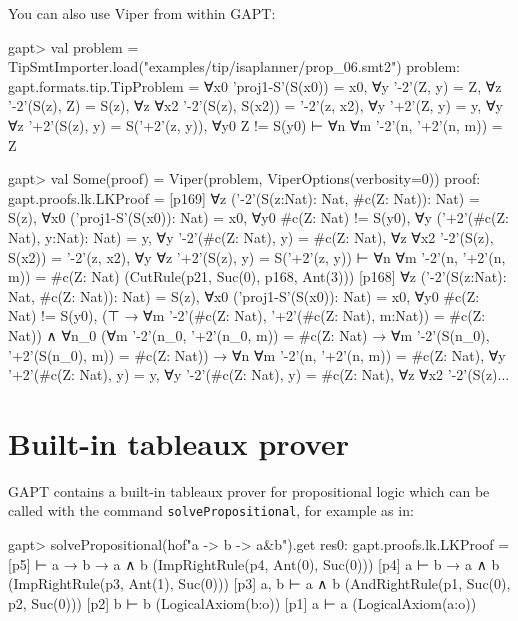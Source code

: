 \documentclass[a4paper,11pt]{book}
\begin{document}
You can also use Viper from within GAPT:
\begin{clilisting}
gapt> val problem = TipSmtImporter.load("examples/tip/isaplanner/prop_06.smt2")
problem: gapt.formats.tip.TipProblem =
∀x0 'proj1-S'(S(x0)) = x0,
∀y '-2'(Z, y) = Z,
∀z '-2'(S(z), Z) = S(z),
∀z ∀x2 '-2'(S(z), S(x2)) = '-2'(z, x2),
∀y '+2'(Z, y) = y,
∀y ∀z '+2'(S(z), y) = S('+2'(z, y)),
∀y0 Z != S(y0)
⊢
∀n ∀m '-2'(n, '+2'(n, m)) = Z

gapt> val Some(proof) = Viper(problem, ViperOptions(verbosity=0))
proof: gapt.proofs.lk.LKProof =
[p169] ∀z ('-2'(S(z:Nat): Nat, #c(Z: Nat)): Nat) = S(z),
∀x0 ('proj1-S'(S(x0)): Nat) = x0,
∀y0 #c(Z: Nat) != S(y0),
∀y ('+2'(#c(Z: Nat), y:Nat): Nat) = y,
∀y '-2'(#c(Z: Nat), y) = #c(Z: Nat),
∀z ∀x2 '-2'(S(z), S(x2)) = '-2'(z, x2),
∀y ∀z '+2'(S(z), y) = S('+2'(z, y))
⊢
∀n ∀m '-2'(n, '+2'(n, m)) = #c(Z: Nat)    (CutRule(p21, Suc(0), p168, Ant(3)))
[p168] ∀z ('-2'(S(z:Nat): Nat, #c(Z: Nat)): Nat) = S(z),
∀x0 ('proj1-S'(S(x0)): Nat) = x0,
∀y0 #c(Z: Nat) != S(y0),
(⊤ → ∀m '-2'(#c(Z: Nat), '+2'(#c(Z: Nat), m:Nat)) = #c(Z: Nat)) ∧
    ∀n_0
    (∀m '-2'(n_0, '+2'(n_0, m)) = #c(Z: Nat) →
      ∀m '-2'(S(n_0), '+2'(S(n_0), m)) = #c(Z: Nat)) →
  ∀n ∀m '-2'(n, '+2'(n, m)) = #c(Z: Nat),
∀y '+2'(#c(Z: Nat), y) = y,
∀y '-2'(#c(Z: Nat), y) = #c(Z: Nat),
∀z ∀x2 '-2'(S(z)...

\end{clilisting}

\section{Built-in tableaux prover}

GAPT contains a built-in tableaux prover for propositional logic
which can be called with the command \texttt{solvePropositional}, for example as in:
\begin{clilisting}
gapt> solvePropositional(hof"a -> b -> a&b").get
res0: gapt.proofs.lk.LKProof =
[p5]  ⊢ a → b → a ∧ b    (ImpRightRule(p4, Ant(0), Suc(0)))
[p4] a ⊢ b → a ∧ b    (ImpRightRule(p3, Ant(1), Suc(0)))
[p3] a, b ⊢ a ∧ b    (AndRightRule(p1, Suc(0), p2, Suc(0)))
[p2] b ⊢ b    (LogicalAxiom(b:o))
[p1] a ⊢ a    (LogicalAxiom(a:o))

\end{clilisting}
\end{document}
